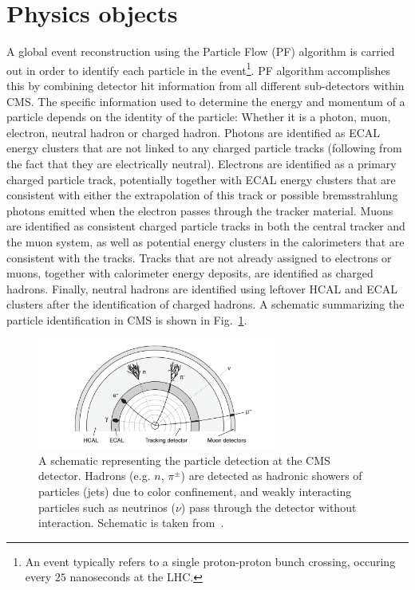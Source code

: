 \section{Physics objects} \label{sec:objects}

\graphicspath{{3_DataAnalysisStrategy/Figures}}

A global event reconstruction using the Particle Flow (PF) algorithm \cite{cms:particle_flow} is carried out in order to
identify each particle in the 
event\footnote{An event typically refers to a single proton-proton bunch crossing, occuring
every $25$ nanoseconds at the LHC.}. 
PF algorithm accomplishes this by combining detector hit information
from all different sub-detectors within CMS. The specific information used to determine the energy
and momentum of a particle depends on the identity of the particle: Whether it is a photon, muon, electron,
neutral hadron or charged hadron. Photons are identified as ECAL energy clusters that are not linked to 
any charged particle tracks (following from the fact that they are electrically neutral). 
Electrons are identified as a primary charged particle track, potentially 
together with ECAL energy clusters that are consistent with either the extrapolation of this track or possible
bremsstrahlung photons emitted when the electron passes through the tracker material. Muons are identified as 
consistent charged particle tracks in both the central tracker and the muon system, as well as potential energy
clusters in the calorimeters that are consistent with the tracks. Tracks that are not already assigned to electrons or muons,
together with calorimeter energy deposits, are identified as charged hadrons. Finally, neutral hadrons are identified using leftover 
HCAL and ECAL clusters after the identification of charged hadrons. A schematic summarizing the particle identification in CMS
is shown in Fig.~\ref{fig:particle_detection_cms}.

\begin{figure}[htbp]
    \centering
    \includegraphics[width=0.7\textwidth]{particle_detection_schematic.png}
    \caption{A schematic representing the particle detection at the CMS detector.
    Hadrons (e.g. $n$, $\pi^{\pm}$) are detected as hadronic showers of particles (jets)
    due to color confinement, and weakly interacting particles such as neutrinos ($\nu$) pass through the
    detector without interaction. Schematic is taken from~\cite{Thomson:2013zua}.}
    \label{fig:particle_detection_cms}
\end{figure}

